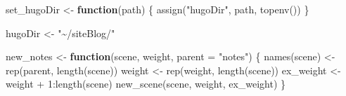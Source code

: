 \documentclass[
]{article}
\newenvironment{Shaded}{\begin{snugshade}}{\end{snugshade}}
\newcommand{\AttributeTok}[1]{\textcolor[rgb]{0.77,0.63,0.00}{#1}}
\newcommand{\ControlFlowTok}[1]{\textcolor[rgb]{0.13,0.29,0.53}{\textbf{#1}}}
\newcommand{\DecValTok}[1]{\textcolor[rgb]{0.00,0.00,0.81}{#1}}
\newcommand{\FunctionTok}[1]{\textcolor[rgb]{0.00,0.00,0.00}{#1}}
\newcommand{\NormalTok}[1]{#1}
\newcommand{\OtherTok}[1]{\textcolor[rgb]{0.56,0.35,0.01}{#1}}
\newcommand{\SpecialCharTok}[1]{\textcolor[rgb]{0.00,0.00,0.00}{#1}}
\newcommand{\StringTok}[1]{\textcolor[rgb]{0.31,0.60,0.02}{#1}}
\begin{document}
\begin{Shaded}
\begin{Highlighting}[]
\NormalTok{set\_hugoDir }\OtherTok{\textless{}{-}} \ControlFlowTok{function}\NormalTok{(path) \{}
  \FunctionTok{assign}\NormalTok{(}\StringTok{"hugoDir"}\NormalTok{, path, }\FunctionTok{topenv}\NormalTok{())}
\NormalTok{\}}

\NormalTok{hugoDir }\OtherTok{\textless{}{-}} \StringTok{"\textasciitilde{}/siteBlog/"}

\NormalTok{new\_notes }\OtherTok{\textless{}{-}} \ControlFlowTok{function}\NormalTok{(scene, weight, }\AttributeTok{parent =} \StringTok{"notes"}\NormalTok{) \{}
  \FunctionTok{names}\NormalTok{(scene) }\OtherTok{\textless{}{-}} \FunctionTok{rep}\NormalTok{(parent, }\FunctionTok{length}\NormalTok{(scene))}
\NormalTok{  weight }\OtherTok{\textless{}{-}} \FunctionTok{rep}\NormalTok{(weight, }\FunctionTok{length}\NormalTok{(scene))}
\NormalTok{  ex\_weight }\OtherTok{\textless{}{-}}\NormalTok{ weight }\SpecialCharTok{+} \DecValTok{1}\SpecialCharTok{:}\FunctionTok{length}\NormalTok{(scene)}
  \FunctionTok{new\_scene}\NormalTok{(scene, weight, ex\_weight)}
\NormalTok{\}}


\end{Highlighting}
\end{Shaded}
\end{document}
